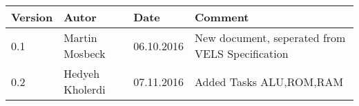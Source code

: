 
\begin{table}[h]
\begin{tabular*}{14.7cm}{|p{}|p{}|p{2cm}|p{}|}
\hline 
Version & Autor & Date & Comment \\[2pt]
\hline
\hline
0.1 & Martin Mosbeck & 06.10.2016& New document, seperated from VELS Specification \\[2pt]
\hline 
0.2 & Hedyeh Kholerdi & 07.11.2016& Added Tasks ALU,ROM,RAM \\[2pt]
\hline 
\end{tabular*}
\end{table}

